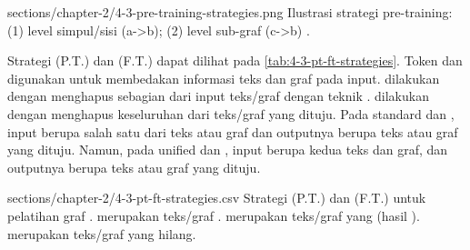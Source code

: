   {sections/chapter-2/4-3-pre-training-strategies.png}
  {Ilustrasi strategi pre-training: (1) \denoising{} level simpul/sisi (a->b); (2) \denoising{} level sub-graf (c->b) .}

Strategi \pretraining{} (P.T.) dan \finetuning{} (F.T.) dapat dilihat pada \cref{tab:4-3-pt-ft-strategies}.
Token  dan  digunakan untuk membedakan informasi teks dan graf pada input.
\Pretraining{} dilakukan dengan menghapus sebagian dari input teks/graf dengan teknik \denoising{}.
\Finetuning{} dilakukan dengan menghapus keseluruhan dari teks/graf yang dituju.
Pada standard \pretraining{} dan \finetuning{}, input berupa salah satu dari teks atau graf dan outputnya berupa teks atau graf yang dituju.
Namun, pada unified \pretraining{} dan \finetuning{}, input berupa kedua teks dan graf, dan outputnya berupa teks atau graf yang dituju.

  {sections/chapter-2/4-3-pt-ft-strategies.csv}
  {
    Strategi \pretraining{} (P.T.) dan \finetuning{} (F.T.) untuk pelatihan graf .
     merupakan teks/graf .
     merupakan teks/graf yang  (hasil \denoising{}).
     merupakan teks/graf yang hilang.
  }

